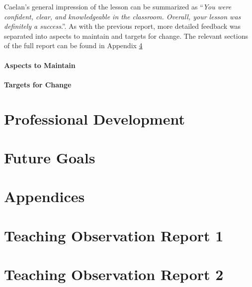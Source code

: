 \documentclass{article}
\begin{document}
Caelan's general impression of the lesson can be summarized as ``\emph{You were confident, clear, and
knowledgeable in the classroom. Overall, your lesson was definitely a success}.''. As with the previous report, more detailed feedback was separated into aspects to maintain and targets for change. The relevant sections of the full report can be found in Appendix \ref{sec:observation-report-2}
\paragraph{Aspects to Maintain}

\paragraph{Targets for Change}

\section{Professional Development}
\section{Future Goals}

\appendix
\section*{Appendices}
\section{Teaching Observation Report 1}\label{sec:observation-report-1}

\section{Teaching Observation Report 2}\label{sec:observation-report-2}
\end{document}

